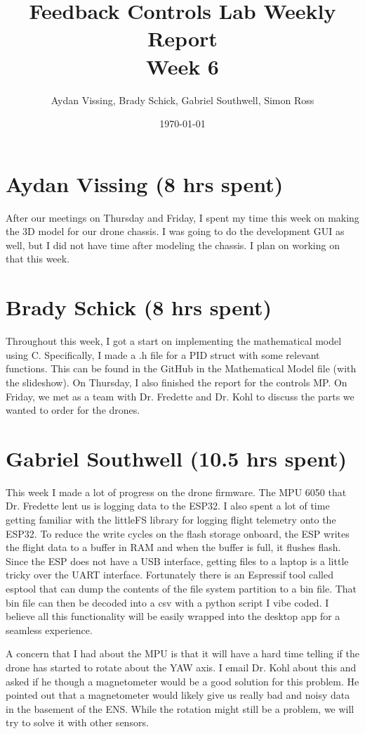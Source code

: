 \documentclass[12pt, titlepage]{article}
\title{Feedback Controls Lab Weekly Report \\ \normalsize{Week 6}}
\author{Aydan Vissing, Brady Schick, Gabriel Southwell, Simon Ross}
\date{\today}
\begin{document}
\maketitle

\section*{Aydan Vissing (8 hrs spent)}

After our meetings on Thursday and Friday, I spent my time this week on making the 3D model for our drone chassis. I was going to do the development GUI as well, but I did not have time after modeling the chassis. I plan on working on that this week. 

\section*{Brady Schick (8 hrs spent)}

Throughout this week, I got a start on implementing the mathematical model using C. Specifically, I made a .h file for a PID struct with some relevant functions. This can be found in the GitHub in the Mathematical Model file (with the slideshow). On Thursday, I also finished the report for the controls MP. On Friday, we met as a team with Dr. Fredette and Dr. Kohl to discuss the parts we wanted to order for the drones.

\section*{Gabriel Southwell (10.5 hrs spent)}

This week I made a lot of progress on the drone firmware. The MPU 6050 that Dr. Fredette lent us is logging data to the ESP32. I also spent a lot of time getting familiar with the littleFS library for logging flight telemetry onto the ESP32. To reduce the write cycles on the flash storage onboard, the ESP writes the flight data to a buffer in RAM and when the buffer is full, it flushes flash. Since the ESP does not have a USB interface, getting files to a laptop is a little tricky over the UART interface. Fortunately there is an Espressif tool called esptool that can dump the contents of the file system partition to a bin file. That bin file can then be decoded into a csv with a python script I vibe coded. I believe all this functionality will be easily wrapped into the desktop app for a seamless experience.

A concern that I had about the MPU is that it will have a hard time telling if the drone has started to rotate about the YAW axis. I email Dr. Kohl about this and asked if he though a magnetometer would be a good solution for this problem. He pointed out that a magnetometer would likely give us really bad and noisy data in the basement of the ENS. While the rotation might still be a problem, we will try to solve it with other sensors.
\end{document}
